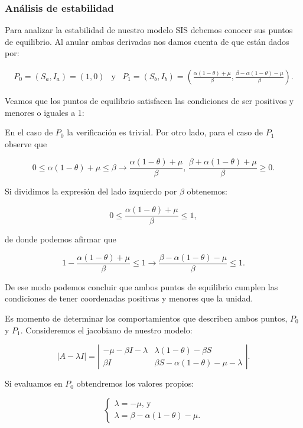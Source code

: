 \subsubsection{Análisis de estabilidad}

Para analizar la estabilidad de nuestro modelo SIS debemos conocer sus puntos de equilibrio. Al anular ambas derivadas nos damos cuenta de que están dados por:

$$\begin{array}{ccc}
    P_0=(S_a,I_a)=(1,0) & \text{y} & P_1=(S_b,I_b)=\left(\frac{\alpha(1-\theta)+\mu}{\beta},\frac{\beta-\alpha(1-\theta)-\mu}{\beta}\right).
\end{array}$$

Veamos que los puntos de equilibrio satisfacen las condiciones de ser positivos y menores o iguales a 1:

En el caso de $P_0$ la verificación es trivial. Por otro lado, para el caso de $P_1$ observe que 

$$0\leq\alpha(1-\theta)+\mu\leq\beta \longrightarrow \frac{\alpha(1-\theta)+\mu}{\beta}\text{, }\frac{\beta+\alpha(1-\theta)+\mu}{\beta}\geq0.$$

Si dividimos la expresión del lado izquierdo por $\beta$ obtenemos:

$$0\leq \frac{\alpha(1-\theta)+\mu}{\beta}\leq1,$$

de donde podemos afirmar que 

$$1-\frac{\alpha(1-\theta)+\mu}{\beta}\leq1 \longrightarrow \frac{\beta-\alpha(1-\theta)-\mu}{\beta}\leq1.$$

De ese modo podemos concluir que ambos puntos de equilibrio cumplen las condiciones de tener coordenadas positivas y menores que la unidad.

Es momento de determinar los comportamientos que describen ambos puntos, $P_0$ y $P_1$. Consideremos el jacobiano de nuestro modelo:

$$|A-\lambda I|=
\left|\begin{array}{cc}
-\mu-\beta I-\lambda & \lambda(1-\theta)-\beta S \\
\beta I & \beta S-\alpha(1-\theta)-\mu-\lambda
\end{array}\right|.$$

Si evaluamos en $P_0$ obtendremos los valores propios:

$$\left\{\begin{array}{l}\lambda=-\mu\text{, y}\\
\lambda=\beta-\alpha(1-\theta)-\mu.\end{array}\right.$$

